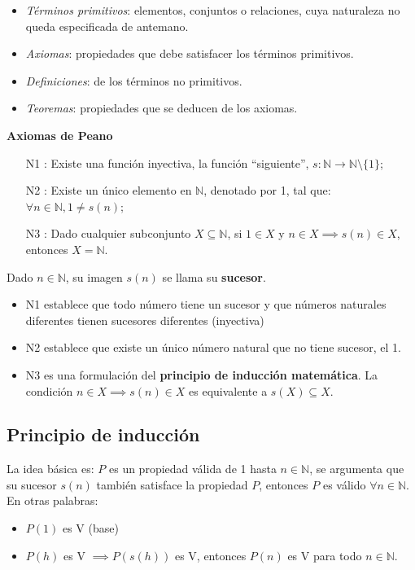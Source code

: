 \begin{itemize}
	\item \textit{Términos primitivos}: elementos, conjuntos o relaciones, cuya naturaleza no queda especificada de antemano.
	\item \textit{Axiomas}: propiedades que debe satisfacer los términos primitivos.
	\item \textit{Definiciones}: de los términos no primitivos.
	\item \textit{Teoremas}: propiedades que se deducen de los axiomas.
\end{itemize}

\textbf{Axiomas de Peano}
\begin{itemize}
	\item[N1]: Existe una función inyectiva, la función ``siguiente'', $s: \mathbb{N} \rightarrow \mathbb{N} \setminus \{1\}$;
	\item[N2]: Existe un único elemento en $\mathbb{N}$, denotado por 1, tal que: $\forall n \in \mathbb{N}, 1 \ne s(n)$;
	\item[N3]: Dado cualquier subconjunto $X \subseteq \mathbb{N}$, si $1 \in X$ y $n \in X \implies s(n) \in X$, entonces $X = \mathbb{N}$.
\end{itemize}
Dado $n \in \mathbb{N}$, su imagen $s(n)$ se llama su \textbf{sucesor}.
\begin{itemize}
	\item N1 establece que todo número tiene un sucesor y que números naturales diferentes tienen sucesores diferentes (inyectiva)
	\item N2 establece que existe un único número natural que no tiene sucesor, el 1.
	\item N3 es una formulación del \textbf{principio de inducción matemática}. La condición $n \in X \implies s(n) \in X$ es equivalente a $s(X) \subseteq X$.
\end{itemize}

\subsection{Principio de inducción} \label{sec:induccion}
La idea básica es: $P$ es un propiedad válida de 1 hasta $n \in \mathbb{N}$, se argumenta que su sucesor $s(n)$ también satisface la propiedad $P$, entonces $P$ es válido $\forall n \in \mathbb{N}$. En otras palabras:

\begin{itemize}
	\item $P(1)$ es V (base)
	\item $P(h)$ es V $\implies P(s(h))$ es V, entonces $P(n)$ es V para todo $n \in \mathbb{N}$.
\end{itemize}

